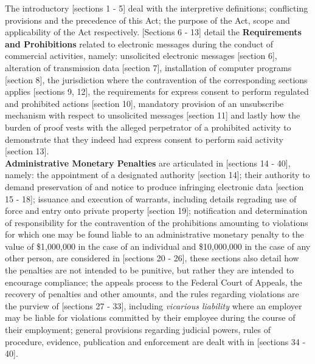 \documentclass[11pt]{article}
\begin{document}
The introductory [sections 1 - 5]\cite{ca10_anti_spam_act} deal with the
interpretive definitions; conflicting provisions and the precedence of this Act;
the purpose of the Act, scope and applicability of the Act respectively.
[Sections 6 - 13]\cite{ca10_anti_spam_act} detail the \textbf{Requirements and
Prohibitions} related to electronic messages during the conduct of commercial
activities, namely: unsolicited electronic messages [section
6]\cite{ca10_anti_spam_act}, alteration of transmission data [section
7]\cite{ca10_anti_spam_act}, installation of computer programs [section
8]\cite{ca10_anti_spam_act}, the jurisdiction where the contravention of the
corresponding sections applies [sections 9, 12]\cite{ca10_anti_spam_act}, the
requirements for express consent to perform regulated and prohibited actions
[section 10]\cite{ca10_anti_spam_act}, mandatory provision of an unsubscribe
mechanism with respect to unsolicited messages [section
11]\cite{ca10_anti_spam_act} and lastly how the burden of proof vests with the
alleged perpetrator of a prohibited activity to demonstrate that they indeed had
express consent to perform said activity [section
13]\cite{ca10_anti_spam_act}.\\

\textbf{Administrative Monetary Penalties} are articulated in [sections
14 - 40]\cite{ca10_anti_spam_act}, namely: the appointment of a designated authority
[section 14]\cite{ca10_anti_spam_act}; their authority to demand preservation of
and notice to produce infringing electronic data [section
15 - 18]\cite{ca10_anti_spam_act}; issuance and execution of warrants, including
details regrading use of force and entry onto private property [section
19]\cite{ca10_anti_spam_act}; notification and determination of responsibility for
the contravention of the prohibitions amounting to violations for which one may
be found liable to an administrative monetary penalty to the value of \$1,000,000
in the case of an individual and \$10,000,000 in the case of any other person,
are considered in [sections 20 - 26]\cite{ca10_anti_spam_act}, these sections also
detail how the penalties are not intended to be punitive, but rather they are
intended to encourage compliance; the appeals process to the Federal Court of
Appeals, the recovery of penalties and other amounts, and the rules regarding
violations are the purview of [sections 27 - 33]\cite{ca10_anti_spam_act}, including
\emph{vicarious liability} where an employer may be liable for violations committed
by their employee during the course of their employment; general provisions
regarding judicial powers, rules of procedure, evidence, publication and
enforcement are dealt with in [sections 34 - 40]\cite{ca10_anti_spam_act}.\\
\end{document}
